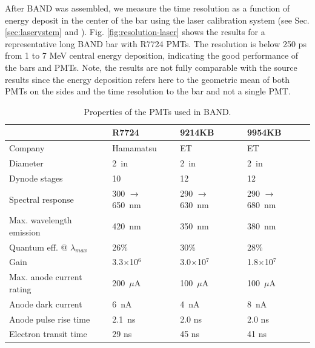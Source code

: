 \documentclass[3p,final,twocolumn]{elsarticle}
\begin{document}
After BAND was assembled, we measure the time resolution as a function of energy deposit in the center of the bar using the laser calibration system (see Sec. \ref{sec:laserystem} and \cite{band-laser}). 
Fig. \ref{fig:resolution-laser} shows the results for a representative long BAND bar with R7724 PMTs. 
The resolution is below 250 \si{\pico\s} from 1 to 7 \si{\mega\electronvolt} central energy deposition, indicating the good performance of the bars and PMTs. Note, the results are not fully comparable with the source results since the energy deposition refers here to the geometric mean of both PMTs on the sides and the time resolution to the bar and not a single PMT.


\begin{table}[tbh]
\caption{Properties of the PMTs used in BAND. }
\centering
\begin{tabular} { l  l  l l } \hline
 &  R7724 \cite{pmtR7724} & 9214KB \cite{pmt9214}& 9954KB \cite{pmt9954} \\ \hline\hline
Company                                  & Hamamatsu       & ET           & ET \\
Diameter                                           & 2~in                         & 2~in                        & 2~in \\ 
Dynode stages                                  & 10                           & 12                              & 12 \\
Spectral response                            & 300 $\to$ 650~nm & 290 $\to$ 630~nm & 290 $\to$ 680~nm \\ 
Max. wavelength emission               & 420~nm & 350~nm & 380~nm \\ 
Quantum eff. @ $\lambda_{max}$   & 26\% & 30\% & 28\% \\ 
Gain                                                    & 3.3$\times$10$^6$ & 3.0$\times$10$^7$ & 1.8$\times$10$^7$ \\ 
Max. anode current rating               & 200~$\mu$A & 100~$\mu$A & 100~$\mu$A \\ 
Anode dark current                         & 6~nA  & 4~nA & 8~nA \\ 
Anode pulse rise time                      & 2.1~ns & 2.0 ns & 2.0 ns \\ 
Electron transit time                        & 29 ns & 45 ns & 41 ns \\
\hline
\end{tabular}
\label{tab:pmts}
\end{table}
\end{document}
